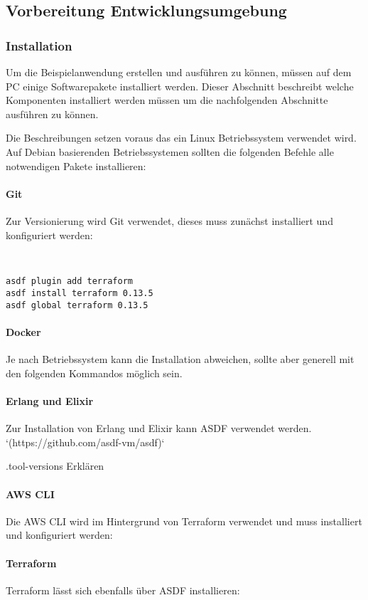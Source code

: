 \subsection{Vorbereitung Entwicklungsumgebung}\label{implementierung_entwicklungsumgebung}

\subsubsection{Installation}

Um die Beispielanwendung erstellen und ausführen zu können, müssen auf dem PC einige Softwarepakete installiert werden.
Dieser Abschnitt beschreibt welche Komponenten installiert werden müssen um die nachfolgenden Abschnitte ausführen zu können.

Die Beschreibungen setzen voraus das ein Linux Betriebssystem verwendet wird.
Auf Debian basierenden Betriebssystemen sollten die folgenden Befehle alle notwendigen Pakete installieren:

\paragraph{Git}

Zur Versionierung wird Git verwendet, dieses muss zunächst installiert und konfiguriert werden:

\lstset{language=bash}
\begin{lstlisting}[frame=htrbl, caption={Git Installation}, label={lst:git_setup}]


asdf plugin add terraform
asdf install terraform 0.13.5
asdf global terraform 0.13.5
\end{lstlisting}

\paragraph{Docker}

Je nach Betriebssystem kann die Installation abweichen, sollte aber generell mit den folgenden Kommandos möglich sein.




\paragraph{Erlang und Elixir}

Zur Installation von Erlang und Elixir kann ASDF verwendet werden. `(https://github.com/asdf-vm/asdf)`

.tool-versions Erklären

\paragraph{AWS CLI}

Die AWS CLI wird im Hintergrund von Terraform verwendet und muss installiert und konfiguriert werden:

\paragraph{Terraform}

Terraform lässt sich ebenfalls über ASDF installieren:
